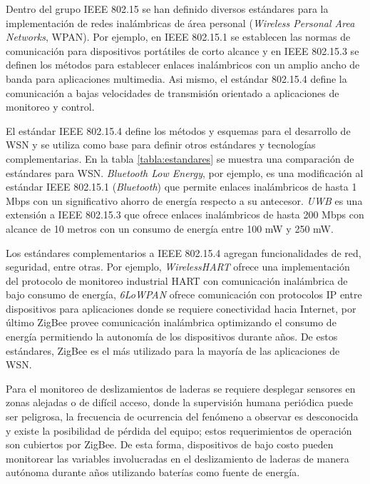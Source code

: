 Dentro del grupo IEEE 802.15 se han definido diversos estándares para la implementación de redes inalámbricas de área personal (\textit{Wireless Personal Area Networks}, WPAN). Por ejemplo, en IEEE 802.15.1 se establecen las normas de comunicación para dispositivos portátiles de corto alcance y en IEEE 802.15.3 se definen los métodos para establecer enlaces inalámbricos con un amplio ancho de banda para aplicaciones multimedia. Asi mismo, el estándar 802.15.4 define la comunicación a bajas velocidades de transmisión orientado a aplicaciones de monitoreo y control\cite{comparative:wireless_protocols}. 

El estándar IEEE 802.15.4 define los métodos y esquemas para el desarrollo de WSN y se utiliza como base para definir otros estándares y tecnologías complementarias. En la tabla \ref{tabla:estandares} se muestra una comparación de estándares para WSN. \textit{Bluetooth Low Energy}\cite{bluetooth:low_energy}, por ejemplo, es una modificación al estándar IEEE 802.15.1 (\textit{Bluetooth}) que permite enlaces inalámbricos de hasta 1 Mbps con un significativo ahorro de energía respecto a su antecesor. \textit{UWB} es una extensión a IEEE 802.15.3 que ofrece enlaces inalámbricos de hasta 200 Mbps con alcance de 10 metros con un consumo de energía entre 100 mW y 250 mW.  

Los estándares complementarios a IEEE 802.15.4 agregan funcionalidades de red, seguridad, entre otras. Por ejemplo, \textit{WirelessHART}\cite{estandar:wirelesshart} ofrece una implementación del protocolo de monitoreo industrial HART con comunicación inalámbrica de bajo consumo de energía, \textit{6LoWPAN}\cite{estandar:6lowpan} ofrece comunicación con protocolos IP entre dispositivos para aplicaciones donde se requiere conectividad hacia Internet, por último ZigBee provee comunicación inalámbrica optimizando el consumo de energía permitiendo la autonomía de los dispositivos durante años. De estos estándares, ZigBee es el más utilizado para la mayoría de las aplicaciones de WSN.  

Para el monitoreo de deslizamientos de laderas se requiere desplegar sensores en zonas alejadas o de difícil acceso, donde la supervisión humana periódica puede ser peligrosa, la frecuencia de ocurrencia del fenómeno a observar es desconocida y existe la posibilidad de pérdida del equipo; estos requerimientos de operación son cubiertos por ZigBee. De esta forma, dispositivos de bajo costo pueden monitorear las variables involucradas en el deslizamiento de laderas de manera autónoma durante años utilizando baterías como fuente de energía. 

